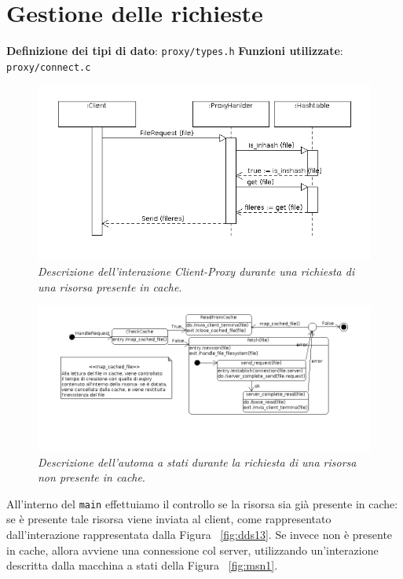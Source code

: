 \section{Gestione delle richieste}\label{sec:gdr}
\begin{itemize}
\diam \textbf{Definizione dei tipi di dato}: \texttt{proxy/types.h} 
\diam \textbf{Funzioni utilizzate}: \texttt{proxy/connect.c} 
\end{itemize}
\begin{figure}[!t]
\includegraphics[scale=0.7]{fig/uml/DiagrammadiSequenza13.png}
\caption{\textit{Descrizione dell'interazione Client-Proxy durante una richiesta
di una risorsa presente in cache}.}
\label{fig:dds13}
\end{figure}
\begin{figure}[!t]
\includegraphics[scale=0.6]{fig/uml/ModelloSenzaNome1.png}
\caption{\textit{Descrizione dell'automa a stati durante la richiesta di una 
risorsa non presente in cache}.}
\label{fig:msn1}
\end{figure}
All'interno del \texttt{main} effettuiamo il controllo se la risorsa sia già presente
in cache: se è presente tale risorsa viene inviata al client, come rappresentato
dall'interazione rappresentata dalla Figura ~\vref{fig:dds13}. Se invece non 
è presente in cache, allora avviene una connessione col server, utilizzando
un'interazione descritta dalla macchina a stati della Figura ~\vref{fig:msn1}.


